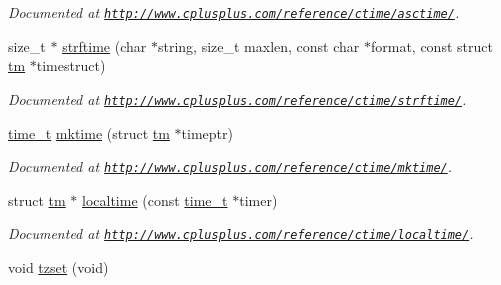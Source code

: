 \begin{DoxyCompactItemize}
\begin{DoxyCompactList}\small\item\em Documented at \href{http://www.cplusplus.com/reference/ctime/asctime/}{\tt http\-://www.\-cplusplus.\-com/reference/ctime/asctime/}. \end{DoxyCompactList}\item 
\hypertarget{group__time_gab385910b876ee7c39c938b181e83db42}{size\-\_\-t $\ast$ \hyperlink{group__time_gab385910b876ee7c39c938b181e83db42}{strftime} (char $\ast$string, size\-\_\-t maxlen, const char $\ast$format, const struct \hyperlink{structtm}{tm} $\ast$timestruct)}\label{group__time_gab385910b876ee7c39c938b181e83db42}

\begin{DoxyCompactList}\small\item\em Documented at \href{http://www.cplusplus.com/reference/ctime/strftime/}{\tt http\-://www.\-cplusplus.\-com/reference/ctime/strftime/}. \end{DoxyCompactList}\item 
\hypertarget{group__time_gae114b9ba0fce4e2d6297e0e66768bb75}{\hyperlink{group__time_ga824afaa48b313f905546cf45822800fc}{time\-\_\-t} \hyperlink{group__time_gae114b9ba0fce4e2d6297e0e66768bb75}{mktime} (struct \hyperlink{structtm}{tm} $\ast$timeptr)}\label{group__time_gae114b9ba0fce4e2d6297e0e66768bb75}

\begin{DoxyCompactList}\small\item\em Documented at \href{http://www.cplusplus.com/reference/ctime/mktime/}{\tt http\-://www.\-cplusplus.\-com/reference/ctime/mktime/}. \end{DoxyCompactList}\item 
\hypertarget{group__time_gaa9336f97d394e8e02d97b9ff4fb0aca2}{struct \hyperlink{structtm}{tm} $\ast$ \hyperlink{group__time_gaa9336f97d394e8e02d97b9ff4fb0aca2}{localtime} (const \hyperlink{group__time_ga824afaa48b313f905546cf45822800fc}{time\-\_\-t} $\ast$timer)}\label{group__time_gaa9336f97d394e8e02d97b9ff4fb0aca2}

\begin{DoxyCompactList}\small\item\em Documented at \href{http://www.cplusplus.com/reference/ctime/localtime/}{\tt http\-://www.\-cplusplus.\-com/reference/ctime/localtime/}. \end{DoxyCompactList}\item 
\hypertarget{group__time_ga7089a565743ec7206aa9de50705b2041}{void \hyperlink{group__time_ga7089a565743ec7206aa9de50705b2041}{tzset} (void)}\label{group__time_ga7089a565743ec7206aa9de50705b2041}


\end{DoxyCompactItemize}
